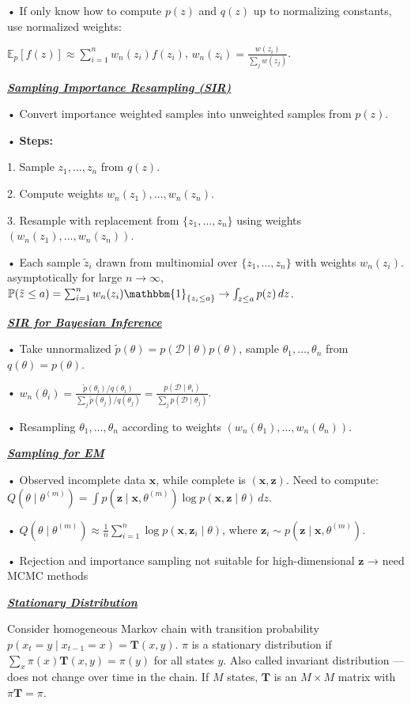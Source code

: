 \documentclass[10pt]{article}
\newcommand{\bulletPoint}[1]{\ul{\textit{\textbf{#1}}}}
\begin{document}
\begin{multicols*}{3}
• If only know how to compute $p(z)$ and $q(z)$ up to normalizing constants, use normalized weights:   

$\mathbb{E}_p[f(z)] \approx \sum_{i=1}^n w_n(z_i)f(z_i)$, $w_n(z_i) = \frac{w(z_i)}{\sum_j w(z_j)}$.

\bulletPoint{Sampling Importance Resampling (SIR)}\quad

• Convert importance weighted samples into unweighted samples from $p(z)$. 

• \textbf{Steps:}

1. Sample $z_1,\dots,z_n$ from $q(z)$. 

2. Compute weights $w_n(z_1),\dots,w_n(z_n)$.

3. Resample with replacement from $\{z_1,\dots,z_n\}$ using weights $(w_n(z_1),\dots,w_n(z_n))$. 

• Each sample $\tilde{z}_i$ drawn from multinomial over $\{z_1,\dots,z_n\}$ with weights $w_n(z_i)$. 
asymptotically for large $n\to\infty$, 
$\mathbb{P}(\tilde{z} \leq a) = \sum_{i=1}^n w_n(z_i)\mathbbm{1}_{\{z_i \leq a\}} \to \int_{z \leq a} p(z)\,dz$. 

\bulletPoint{SIR for Bayesian Inference}\quad

• Take unnormalized $\tilde{p}(\theta) = p(\mathcal{D} \mid \theta)p(\theta)$, sample $\theta_1,\dots,\theta_n$ from $q(\theta) = p(\theta)$. 

• $w_n(\theta_i) = \frac{\tilde{p}(\theta_i)/q(\theta_i)}{\sum_j \tilde{p}(\theta_j)/q(\theta_j)} = \frac{p(\mathcal{D} \mid \theta_i)}{\sum_j p(\mathcal{D} \mid \theta_j)}$. 

• Resampling $\theta_1,\dots,\theta_n$ according to weights $(w_n(\theta_1),\dots,w_n(\theta_n))$. 

\bulletPoint{Sampling for EM}\quad

• Observed incomplete data $\mathbf{x}$, while complete is $\mathbf{(x,z)}$. 
Need to compute:
$Q(\theta \mid \theta^{(m)}) = \int p(\mathbf{z} \mid \mathbf{x}, \theta^{(m)}) \log p(\mathbf{x}, \mathbf{z} \mid \theta)\,dz$. 

• $Q(\theta \mid \theta^{(m)}) \approx \frac{1}{n} \sum_{i=1}^n \log p(\mathbf{x}, \mathbf{z}_i \mid \theta)$, where $\mathbf{z}_i \sim p(\mathbf{z} \mid \mathbf{x}, \theta^{(m)})$. 

• Rejection and importance sampling not suitable for high-dimensional $\mathbf{z}$ → need MCMC methods

\bulletPoint{Stationary Distribution}\quad

Consider homogeneous Markov chain with transition probability $p(x_t = y \mid x_{t-1} = x) = \mathbf{T}(x, y)$. 
$\pi$ is a stationary distribution if $\sum_x \pi(x)\mathbf{T}(x, y) = \pi(y)$ for all states $y$. 
Also called invariant distribution — does not change over time in the chain. 
If $M$ states, $\mathbf{T}$ is an $M \times M$ matrix with $\pi \mathbf{T} = \pi$. 


\end{multicols*}
\end{document}
